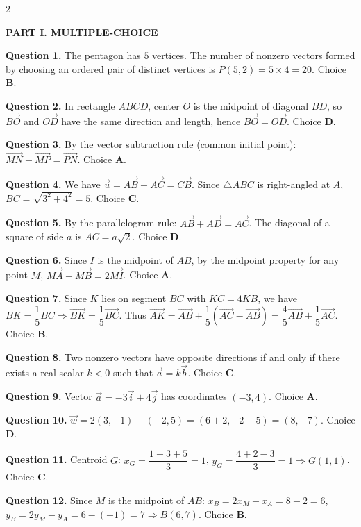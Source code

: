 \documentclass[10pt,a4paper]{article}
\begin{document}
\begin{multicols}{2}
\raggedcolumns
\small

\textbf{\color{accent}PART I. MULTIPLE-CHOICE}

\textbf{Question 1.} The pentagon has $5$ vertices. The number of nonzero vectors formed by choosing an ordered pair of distinct vertices is $P(5,2) = 5 \times 4 = 20$. Choice \textbf{B}.

\textbf{Question 2.} In rectangle $ABCD$, center $O$ is the midpoint of diagonal $BD$, so $\vec{BO}$ and $\vec{OD}$ have the same direction and length, hence $\vec{BO} = \vec{OD}$. Choice \textbf{D}.

\textbf{Question 3.} By the vector subtraction rule (common initial point): $\vec{MN} - \vec{MP} = \vec{PN}$. Choice \textbf{A}.

\textbf{Question 4.} We have $\vec{u} = \vec{AB} - \vec{AC} = \vec{CB}$. Since $\triangle ABC$ is right-angled at $A$, $BC = \sqrt{3^2 + 4^2} = 5$. Choice \textbf{C}.

\textbf{Question 5.} By the parallelogram rule: $\vec{AB} + \vec{AD} = \vec{AC}$. The diagonal of a square of side $a$ is $AC = a\sqrt{2}$. Choice \textbf{D}.

\textbf{Question 6.} Since $I$ is the midpoint of $AB$, by the midpoint property for any point $M$, $\vec{MA} + \vec{MB} = 2\vec{MI}$. Choice \textbf{A}.

\textbf{Question 7.} Since $K$ lies on segment $BC$ with $KC = 4KB$, we have $BK = \dfrac{1}{5}BC \Rightarrow \vec{BK} = \dfrac{1}{5}\vec{BC}$. Thus $\vec{AK} = \vec{AB} + \dfrac{1}{5}(\vec{AC} - \vec{AB}) = \dfrac{4}{5}\vec{AB} + \dfrac{1}{5}\vec{AC}$. Choice \textbf{B}.

\textbf{Question 8.} Two nonzero vectors have opposite directions if and only if there exists a real scalar $k < 0$ such that $\vec{a} = k\vec{b}$. Choice \textbf{C}.

\textbf{Question 9.} Vector $\vec{a} = -3\vec{i} + 4\vec{j}$ has coordinates $(-3, 4)$. Choice \textbf{A}.

\textbf{Question 10.} $\vec{w} = 2(3, -1) - (-2, 5) = (6 + 2, -2 - 5) = (8, -7)$. Choice \textbf{D}.

\columnbreak

\textbf{Question 11.} Centroid $G$: $x_G = \dfrac{1 - 3 + 5}{3} = 1$, $y_G = \dfrac{4 + 2 - 3}{3} = 1 \Rightarrow G(1, 1)$. Choice \textbf{C}.

\textbf{Question 12.} Since $M$ is the midpoint of $AB$: $x_B = 2x_M - x_A = 8 - 2 = 6$, $y_B = 2y_M - y_A = 6 - (-1) = 7 \Rightarrow B(6, 7)$. Choice \textbf{B}.


\end{multicols}
\end{document}

